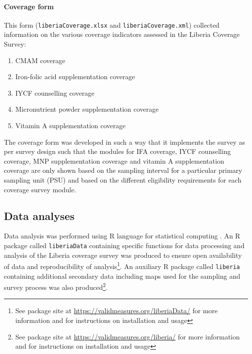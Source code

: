\documentclass[12pt,a4paper]{article}
\let\oldparagraph\paragraph
\renewcommand{\paragraph}[1]{\oldparagraph{#1}\mbox{}}
\let\rmarkdownfootnote\footnote%
\def\footnote{\protect\rmarkdownfootnote}
\begin{document}
\hypertarget{coverage-form}{%
\paragraph{Coverage form}\label{coverage-form}}

This form (\texttt{liberiaCoverage.xlsx} and \texttt{liberiaCoverage.xml}) collected information on the various coverage indicators assessed in the Liberia Coverage Survey:

\begin{enumerate}
\def\labelenumi{\arabic{enumi}.}
\item
  CMAM coverage
\item
  Iron-folic acid supplementation coverage
\item
  IYCF counselling coverage
\item
  Micronutrient powder supplementation coverage
\item
  Vitamin A supplementation coverage
\end{enumerate}

The coverage form was developed in such a way that it implements the survey as per survey design such that the modules for IFA coverage, IYCF counselling coverage, MNP supplementation coverage and vitamin A supplementation coverage are only shown based on the sampling interval for a particular primary sampling unit (PSU) and based on the different eligibility requirements for each coverage survey module.

\hypertarget{data-analyses}{%
\subsection{Data analyses}\label{data-analyses}}

Data analysis was performed using R language for statistical computing \citep{R:2019rr}. An R package called \texttt{liberiaData} containing specific functions for data processing and analysis of the Liberia coverage survey was produced to ensure open availability of data and reproducibility of analysis\footnote{See package site at \url{https://validmeasures.org/liberiaData/} for more information and for instructions on installation and usage}. An auxiliary R package called \texttt{liberia} containing additional secondary data including maps used for the sampling and survey process was also produced\footnote{See package site at \url{https://validmeasures.org/liberia/} for more information and for instructions on installation and usage}.
\end{document}

